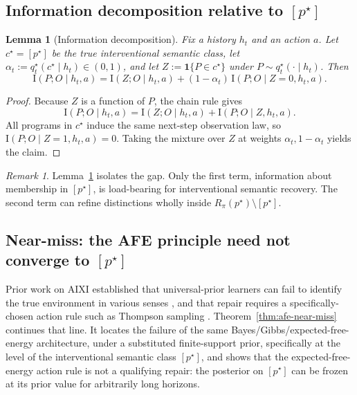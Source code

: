 \documentclass[11pt]{article}
\newtheorem{lemma}[theorem]{Lemma}
\theoremstyle{definition}
\theoremstyle{remark}
\newtheorem{remark}[theorem]{Remark}
\newcommand{\I}{\mathrm{I}}
\newcommand{\one}{\mathbf{1}}
\begin{document}
\subsection{Information decomposition relative to $[p^\star]$}

\begin{lemma}[Information decomposition]
\label{lem:info-decomp}
Fix a history $h_t$ and an action $a$. Let $c^\star=[p^\star]$ be the true interventional semantic class, let $\alpha_t:=q_t^\star(c^\star\mid h_t)\in(0,1)$, and let $Z:=\one\{P\in c^\star\}$ under $P\sim q_t^\star(\cdot\mid h_t)$. Then
\[
\I(P;O\mid h_t,a)
=
\I(Z;O\mid h_t,a)+(1-\alpha_t)\,\I(P;O\mid Z=0,h_t,a).
\]
\end{lemma}

\begin{proof}
Because $Z$ is a function of $P$, the chain rule gives
\[
\I(P;O\mid h_t,a)=\I(Z;O\mid h_t,a)+\I(P;O\mid Z,h_t,a).
\]
All programs in $c^\star$ induce the same next-step observation law, so $\I(P;O\mid Z=1,h_t,a)=0$. Taking the mixture over $Z$ at weights $\alpha_t,1-\alpha_t$ yields the claim.
\end{proof}

\begin{remark}
Lemma~\ref{lem:info-decomp} isolates the gap. Only the first term, information about membership in $[p^\star]$, is load-bearing for interventional semantic recovery. The second term can refine distinctions wholly inside $R_\pi(p^\star)\setminus[p^\star]$.
\end{remark}

\subsection{Near-miss: the AFE principle need not converge to $[p^\star]$}

Prior work on AIXI established that universal-prior learners can fail to identify the true environment in various senses \citep{LeikeHutter2015,Leike2016}, and that repair requires a specifically-chosen action rule such as Thompson sampling \citep{LeikeEtAl2016}. Theorem~\ref{thm:afe-near-miss} continues that line. It locates the failure of the same Bayes/Gibbs/expected-free-energy architecture, under a substituted finite-support prior, specifically at the level of the interventional semantic class $[p^\star]$, and shows that the expected-free-energy action rule is not a qualifying repair: the posterior on $[p^\star]$ can be frozen at its prior value for arbitrarily long horizons.
\end{document}

